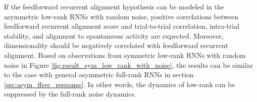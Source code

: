 \documentclass[11pt]{article}
\begin{document}
	If the feedforward recurrent alignment hypothesis can be modeled in the asymmetric low-rank RNNs with random noise, positive correlations between feedforward recurrent alignment score and trial-to-trial correlation, intra-trial stability, and alignment to spontaneous activity are expected. Moreover, dimensionality should be negatively correlated with feedforward recurrent alignment. Based on observations from symmetric low-rank RNNs with random noise in Figure \ref{fig:result_sym_low_rank_with_noise}, the results can be similar to the case with general asymmetric full-rank RNNs in section \ref{sec:asym_ffrec_response}. In other words, the dynamics of low-rank can be suppressed by the full-rank noise dynamics.  
	
\end{document}
